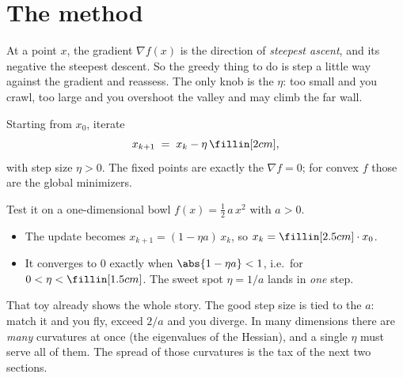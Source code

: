 \section{The method}\label{sec:method}
\quad{}

\begin{strand}
At a point $x$, the gradient $\nabla f(x)$ is the direction of \emph{steepest ascent}, and its
negative the steepest descent. So the greedy thing to do is step a little way against the gradient
and reassess. The only knob is the  $\eta$: too small and you crawl, too large
and you overshoot the valley and may climb the far wall.
\end{strand}


\begin{definition}\label{def:gd}
Starting from $x_0$, iterate
\[
  x_{k+1}\;=\;x_k-\eta\,\fillin[2cm],
\]
with step size $\eta>0$. The fixed points are exactly the 
$\nabla f=0$; for convex $f$ those are the global minimizers.
\end{definition}


\begin{yourturn}
Test it on a one-dimensional bowl $f(x)=\tfrac12\,a\,x^2$ with $a>0$.
\begin{itemize}[leftmargin=1.3em,itemsep=1pt]
  \item The update becomes $x_{k+1}=(1-\eta a)\,x_k$, so $x_k=\fillin[2.5cm]\cdot x_0$.
  \item It converges to $0$ exactly when $\abs{1-\eta a}<1$, i.e.\ for $0<\eta<\fillin[1.5cm]$.
        The sweet spot $\eta=1/a$ lands in \emph{one} step. 
\end{itemize}
\workspace[2]
\end{yourturn}

\begin{strand}
That toy already shows the whole story. The good step size is tied to the  $a$:
match it and you fly, exceed $2/a$ and you diverge. In many dimensions there are \emph{many}
curvatures at once (the eigenvalues of the Hessian), and a single $\eta$ must serve all of them.
The spread of those curvatures is the tax of the next two sections.
\end{strand}

